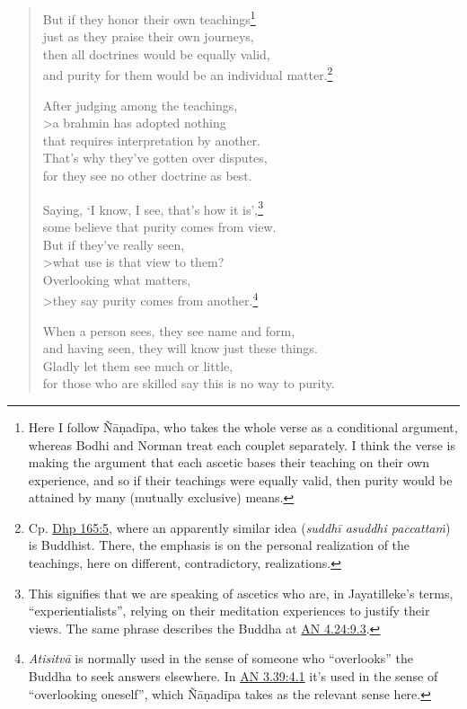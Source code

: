 \documentclass[12pt,openany]{book}%
\begin{document}
\begin{verse}
But if they honor their own teachings\footnote{Here I follow \textsanskrit{Ñāṇadīpa}, who takes the whole verse as a conditional argument, whereas Bodhi and Norman treat each couplet separately. I think the verse is making the argument that each ascetic bases their teaching on their own experience, and so if their teachings were equally valid, then purity would be attained by many (mutually exclusive) means. } \\
just as they praise their own journeys, \\
then all doctrines would be equally valid, \\
and purity for them would be an individual matter.\footnote{Cp. \href{https://suttacentral.net/dhp165/en/sujato\#5}{Dhp 165:5}, where an apparently similar idea (\textit{\textsanskrit{suddhī} asuddhi \textsanskrit{paccattaṁ}}) is Buddhist. There, the emphasis is on the personal realization of the teachings, here on different, contradictory, realizations. } 

After judging among the teachings, \\>a brahmin has adopted nothing \\
that requires interpretation by another. \\
That’s why they’ve gotten over disputes, \\
for they see no other doctrine as best. 

Saying, ‘I know, I see, that’s how it is’,\footnote{This signifies that we are speaking of ascetics who are, in Jayatilleke’s terms, “experientialists”, relying on their meditation experiences to justify their views. The same phrase describes the Buddha at \href{https://suttacentral.net/an4.24/en/sujato\#9.3}{AN 4.24:9.3}. } \\
some believe that purity comes from view. \\
But if they’ve really seen, \\>what use is that view to them? \\
Overlooking what matters, \\>they say purity comes from another.\footnote{\textit{\textsanskrit{Atisitvā}} is normally used in the sense of someone who “overlooks” the Buddha to seek answers elsewhere. In \href{https://suttacentral.net/an3.39/en/sujato\#4.1}{AN 3.39:4.1} it’s used in the sense of “overlooking oneself”, which \textsanskrit{Ñāṇadīpa} takes as the relevant sense here. } 

When a person sees, they see name and form, \\
and having seen, they will know just these things. \\
Gladly let them see much or little, \\
for those who are skilled say this is no way to purity. 


\end{verse}
\end{document}
